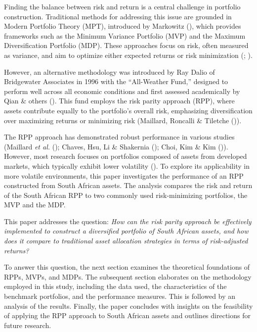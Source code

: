 \documentclass[11pt,preprint]{elsarticle}
\numberwithin{equation}{section}
\numberwithin{figure}{section}
\numberwithin{table}{section}
\begin{document}
Finding the balance between risk and return is a central challenge in
portfolio construction. Traditional methods for addressing this issue
are grounded in Modern Portfolio Theory (MPT), introduced by Markowitz
(), which
provides frameworks such as the Minimum Variance Portfolio (MVP) and the
Maximum Diversification Portfolio (MDP). These approaches focus on risk,
often measured as variance, and aim to optimize either expected returns
or risk minimization (; ).

However, an alternative methodology was introduced by Ray Dalio of
Bridgewater Associates in 1996 with the ``All-Weather Fund,'' designed
to perform well across all economic conditions and first assessed
academically by Qian \& others (). This
fund employs the risk parity approach (RPP), where assets contribute
equally to the portfolio's overall risk, emphasizing diversification
over maximizing returns or minimizing risk (Maillard, Roncalli \&
Tiletche ()).

The RPP approach has demonstrated robust performance in various studies
(Maillard \emph{et al.} ();
Chaves, Hsu, Li \& Shakernia ();
Choi, Kim \& Kim ()). However,
most research focuses on portfolios composed of assets from developed
markets, which typically exhibit lower volatility
(). To explore its applicability in more volatile
environments, this paper investigates the performance of an RPP
constructed from South African assets. The analysis compares the risk
and return of the South African RPP to two commonly used risk-minimizing
portfolios, the MVP and the MDP.

This paper addresses the question: \emph{How can the risk parity
approach be effectively implemented to construct a diversified portfolio
of South African assets, and how does it compare to traditional asset
allocation strategies in terms of risk-adjusted returns?}

To answer this question, the next section examines the theoretical
foundations of RPPs, MVPs, and MDPs. The subsequent section elaborates
on the methodology employed in this study, including the data used, the
characteristics of the benchmark portfolios, and the performance
measures. This is followed by an analysis of the results. Finally, the
paper concludes with insights on the feasibility of applying the RPP
approach to South African assets and outlines directions for future
research.
\end{document}
